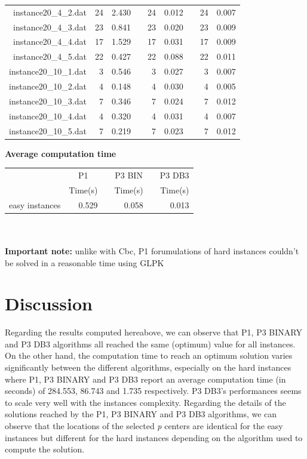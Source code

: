 \begin{table}[h!]
\begin{tabular}{@{}rrrcrrcrr@{}}
instance20\_4\_2.dat & 24 & 2.430 & & 24 & 0.012 & & 24 & 0.007 \\
instance20\_4\_3.dat & 23 & 0.841 & & 23 & 0.020 & & 23 & 0.009 \\
instance20\_4\_4.dat & 17 & 1.529 & & 17 & 0.031 & & 17 & 0.009 \\
instance20\_4\_5.dat & 22 & 0.427 & & 22 & 0.088 & & 22 & 0.011 \\
instance20\_10\_1.dat & 3 & 0.546 & & 3 & 0.027 & & 3 & 0.007 \\
instance20\_10\_2.dat & 4 & 0.148 & & 4 & 0.030 & & 4 & 0.005 \\
instance20\_10\_3.dat & 7 & 0.346 & & 7 & 0.024 & & 7 & 0.012 \\
instance20\_10\_4.dat & 4 & 0.320 & & 4 & 0.031 & & 4 & 0.007 \\
instance20\_10\_5.dat & 7 & 0.219 & & 7 & 0.023 & & 7 & 0.012 \\
\end{tabular}
\end{table}
\newpage
\begin{center}
\textbf{Average computation time}
\end{center}
\begin{table}[h!]\centering
{}
\begin{tabular}{@{}rrcrcr@{}}\toprule
& \multicolumn{1}{c}{P1} & \phantom{abc} & \multicolumn{1}{c}{P3 BIN} & \phantom{abc} & \multicolumn{1}{c}{P3 DB3}\\
& Time(s) & & Time(s) & & Time(s)\\ \midrule
easy instances & 0.529 & & 0.058 & & 0.013 \\
\bottomrule
\end{tabular}
\end{table}\ \\\\
\textbf{Important note:} unlike with Cbc, P1 forumulations of hard instances couldn't be solved in a reasonable time using GLPK
\newpage
\chapter{Discussion}
Regarding the results computed hereabove, we can observe that P1, P3 BINARY and P3 DB3 algorithms all reached the same (optimum) value for all instances. On the other hand, the computation time to reach an optimum solution varies significantly between the different algorithms, especially on the hard instances where P1, P3 BINARY and P3 DB3 report an average computation time (in seconds) of 284.553, 86.743 and 1.735 respectively. P3 DB3's performances seems to scale very well with the instances complexity.
Regarding the details of the solutions reached by the P1, P3 BINARY and P3 DB3 algorithms, we can observe that the locations of the selected \textit{p} centers are identical for the easy instances but different for the hard instances depending on the algorithm used to compute the solution.